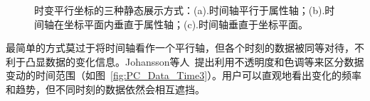 \documentclass[12pt,twocolumn]{article}
\begin{document}
\begin{figure}[!htb]
\centering
{}
\caption{\label{fig:PC_Data_Time5}时变平行坐标的三种静态展示方式：(a).时间轴平行于属性轴；(b).时间轴在坐标平面内垂直于属性轴；(c).时间轴垂直于坐标平面。}
\end{figure}

最简单的方式莫过于将时间轴看作一个平行轴，但各个时刻的数据被同等对待，不利于凸显数据的变化信息。Johansson等人~\citep{johansson2007depth}提出利用不透明度和色调等来区分数据变动的时间范围（如图~\ref{fig:PC_Data_Time3}）。用户可以直观地看出变化的频率和趋势，但不同时刻的数据依然会相互遮挡。
\end{document}
